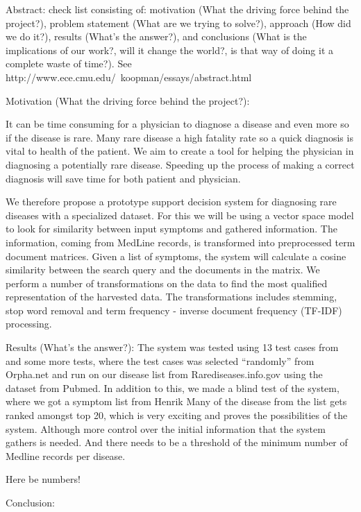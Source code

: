 Abstract:
check list consisting of: motivation (What the driving force behind the project?), problem statement (What are we trying to solve?), approach (How did we do it?), results (What's the answer?), and conclusions (What is the implications of our work?, will it change the world?, is that way of doing it a complete waste of time?). See http://www.ece.cmu.edu/~koopman/essays/abstract.html

Motivation (What the driving force behind the project?):

It can be time consuming for a physician to diagnose a disease and even more so if the disease is rare. Many rare disease a high fatality rate so a quick diagnosis is vital to health of the patient. We aim to create a tool for helping the physician in diagnosing a potentially rare disease. Speeding up the process of making a correct diagnosis will save time for both patient and physician.

We therefore propose a prototype support decision system for diagnosing rare diseases with a specialized dataset. For this we will be using a vector space model to look for similarity between input symptoms and gathered information. The information, coming from MedLine records, is transformed into preprocessed term document matrices. Given a list of symptoms, the system will calculate a cosine similarity between the search query and the documents in the matrix. We perform a number of transformations on the data to find the most qualified representation of the harvested data. The transformations includes stemming, stop word removal and term frequency - inverse document frequency (TF-IDF) processing.

Results (What's the answer?):
The system was tested using 13 test cases from \cite{HangwiTang11102006} and some more tests, where the test cases was selected ``randomly'' from Orpha.net and run on our disease list from Rarediseases.info.gov using the dataset from Pubmed. In addition to this, we made a blind test of the system, where we got a symptom list from Henrik \cite{TheDude} Many of the disease from the list gets ranked amongst top 20, which is very exciting and proves the possibilities of the system. Although more control over the initial information that the system gathers is needed. And there needs to be a threshold of the minimum number of Medline records per disease.

Here be numbers!

Conclusion:
